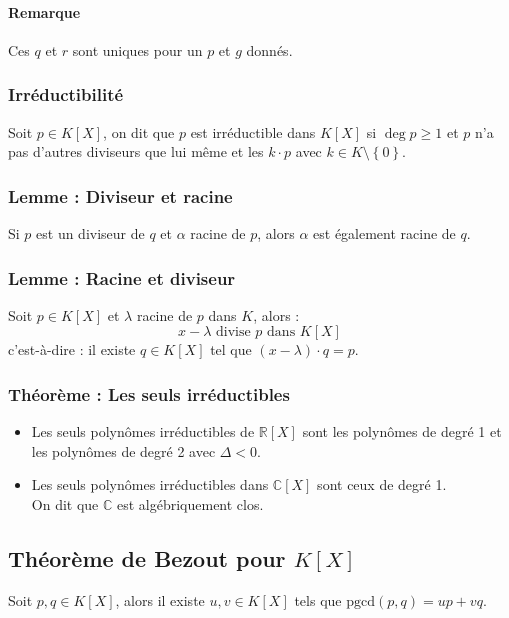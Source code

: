 \documentclass[a4paper,10pt]{article}
\newcommand{\set}[1]{\left\lbrace #1 \right\rbrace } %
\newcommand{\RR}{\mathbb{R}} %
\newcommand{\CC}{\mathbb{C}} %
\newcommand{\pgcd}{\mathrm{pgcd}} %
\begin{document}
    \paragraph{Remarque} Ces $q$ et $r$ sont uniques pour un $p$ et $g$ donnés. 

   \subsubsection{Irréductibilité}
    Soit $p \in K[X]$, on dit que $p$ est irréductible dans $K[X]$ si $\deg p \geq 1$ et $p$ n'a pas d'autres diviseurs que lui même et les $k \cdot p$ avec $k \in K\setminus \set{0}$.

   \subsubsection{Lemme : Diviseur et racine}
    Si $p$ est un diviseur de $q$ et $\alpha$ racine de $p$, alors $\alpha$ est également racine de $q$.

   \subsubsection{Lemme : Racine et diviseur}%
    Soit $p \in K[X]$ et $\lambda$ racine de $p$ dans $K$, alors :
     $$x-\lambda \text{ divise } p \text{ dans } K[X]$$
    c'est-à-dire : il existe $q\in K[X]$ tel que $(x-\lambda)\cdot q = p$.

   \subsubsection{Théorème : Les seuls irréductibles}
    \begin{itemize}
     \item Les seuls polynômes irréductibles de $\RR[X]$ sont les polynômes de degré 1 et les polynômes de degré 2 avec $\Delta < 0$.
     \item Les seuls polynômes irréductibles dans $\CC[X]$ sont ceux de degré 1.\\
      On dit que $\CC$ est algébriquement clos.
    \end{itemize}

  \subsection{Théorème de Bezout pour $K[X]$}%
   Soit $p,q \in K[X]$, alors il existe $u,v \in K[X]$ tels que $\pgcd (p,q)=up+vq$.
\end{document}
